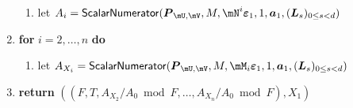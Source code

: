 \documentclass[12pt]{article}
\newcommand{\mat}[1]{\bm{\MakeUppercase{#1}}} %
\newcommand{\row}[1]{\bm{\MakeLowercase{#1}}} %
\newcommand{\col}[1]{\bm{\MakeLowercase{#1}}} %
\begin{document}
\begin{algorithm}[H]
\begin{enumerate}
\begin{enumerate}
    \item\label{X1step9}  let $A_i = \mathsf{{\sf ScalarNumerator}}(\mat{P}_{\mU,\mV}, M, 
      \mN^i \col{\varepsilon}_1, 1, \row{a}_1, (\mat{L}_s)_{0 \le s<d})$
    \end{enumerate}
  \item\label{X1step10} \textbf{for} $i=2,\dots,n$ \textbf{do}
    \begin{enumerate}
     \item let $A_{X_i} = \mathsf{{\sf ScalarNumerator}}(\mat{P}_{\mU,\mV}, M, \mM_i\col{\varepsilon}_1, 1, \row{a}_1, (\mat{L}_s)_{0 \le s <d})$
    \end{enumerate}
\item\label{X1step11}   \textbf{return} $((F,T,A_{X_2}/ A_0 \bmod F, \dots,A_{X_n}/A_{0} \bmod F),X_1)$
  \end{enumerate}  \label{algo:X1block-sparse-fglm}
\end{algorithm}
\end{document}

